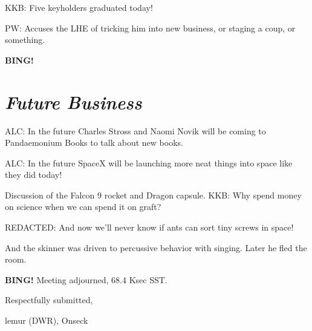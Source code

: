 \documentclass[10pt]{article}
\newcommand{\bing}{{\bf BING!} }
\newcommand{\goto}[1]{\bing \vskip 12pt \section*{{\em{#1}}}}
\newcommand{\onseck}{lemur (DWR), Onseck}
\begin{document}
KKB: Five keyholders graduated today!

PW: Accuses the LHE of tricking him into new business, or staging a coup, or something.

\goto{Future Business}

ALC: In the future Charles Stross and Naomi Novik will be coming to Pandaemonium Books to talk about new books.

ALC: In the future SpaceX will be launching more neat things into space like they did today!

Discussion of the Falcon 9 rocket and Dragon capsule.  KKB: Why spend money on science when we can spend it on graft?

REDACTED: And now we'll never know if ants can sort tiny screws in space!

And the skinner was driven to percussive behavior with singing.  Later he fled the room.

\bing
\noindent
Meeting adjourned, 68.4 Ksec SST.

\vspace{18pt}

\centerline{Respectfully submitted,}
\centerline{\onseck}
\end{document}
